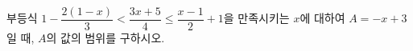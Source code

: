 부등식 $1-\dfrac{2(1-x)}{3}<\dfrac{3x+5}{4}\le \dfrac{x-1}{2}+1$을 만족시키는 $x$에 대하여 $A=-x+3$일 때, $A$의 값의 범위를 구하시오.
